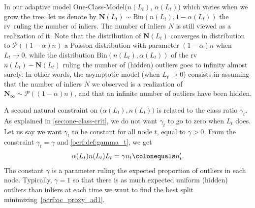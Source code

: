 \begin{remark}
    In our adaptive model One-Class-Model($n(L_t)$, $\alpha(L_t)$) which varies
    when we grow the tree, let us denote by $\mathbf{N}(L_t) \sim
    \text{Bin}\left(n(L_t), 1-\alpha(L_t)\right)$ the \acs{rv}~ruling the
    number of inliers. The number of inliers $N$ is still viewed as a
    realization of it.  Note that the distribution of $\mathbf{N}(L_t)$
    converges in distribution to $\mathcal{P}\left((1-\alpha)n\right)$ a
    Poisson distribution with parameter $(1-\alpha) n$ when $L_t \to 0$, while
    the distribution $\text{Bin}\left(n(L_t), \alpha(L_t)\right)$ of the
    \acs{rv}~$n(L_t) - \mathbf{N}(L_t)$ ruling the number of (hidden) outliers
    goes to infinity almost surely. In other words, the asymptotic model (when
    $L_t \to 0$) consists in assuming that the number of inliers $N$ we
    observed is a realization of $\mathbf{N}_\infty \sim
    \mathcal{P}\left((1-\alpha)n\right)$, and that an infinite number of
    outliers have been hidden.
\end{remark}
A second natural constraint on $\big(\alpha(L_t), n(L_t)\big)$ is related to
the class ratio $\gamma_t$. 
As explained in \cref{sec:one-class-crit}, we do not want $\gamma_t$ to go to
zero when $L_t$ does.  Let us say we want $\gamma_t$ to be constant for all
node $t$, equal to $\gamma>0$. From the constraint $\gamma_t = \gamma$ and
\cref{ocrf:def:gamma_t}, we get 
\begin{dmath}
    \label{ocrf:constraint2}
    \alpha(L_t) n(L_t) L_t 
    = \gamma n_t \colonequals n_t'.
\end{dmath}
The constant $\gamma$ is a parameter ruling the expected proportion of outliers
in each node. Typically, $\gamma=1$ so that there is as much expected uniform
(hidden) outliers than inliers at each time we want to find the best split
minimizing~\cref{ocrf:oc_proxy_ad1}.
